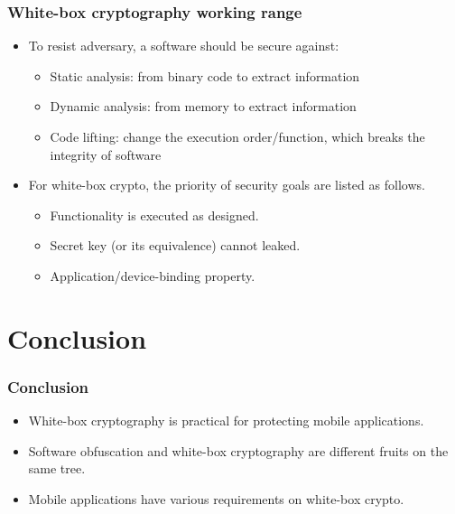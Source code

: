 \documentclass{beamer}
\begin{document}
\frame
{
\frametitle{White-box cryptography working range}
\begin{itemize}
\setlength{\itemsep}{12pt}
\item To resist adversary, a software should be secure against:
\begin{itemize}
\setlength{\itemsep}{12pt}
\item Static analysis: from binary code to extract information

\item Dynamic analysis: from memory to extract information

\item Code lifting: change the execution order/function, which breaks the integrity of software
\end{itemize}

\item For white-box crypto, the priority of security goals are listed as follows.
\begin{itemize}
\setlength{\itemsep}{12pt}
\item Functionality is executed as designed.

\item Secret key (or its equivalence) cannot leaked.

\item Application/device-binding property.
\end{itemize}

\end{itemize}

}
\section{Conclusion}

\frame
{
\frametitle{Conclusion}

\begin{itemize}
\setlength{\itemsep}{12pt}
\item White-box cryptography is practical for protecting mobile applications.

\item Software obfuscation and white-box cryptography are different fruits on the same tree.

\item Mobile applications have various requirements on white-box crypto.

\end{itemize}

}
\end{document}
